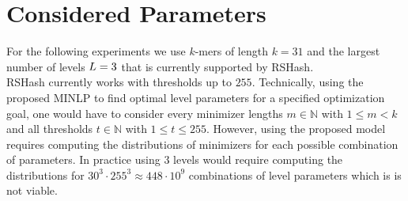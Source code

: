 \documentclass[a4paper,titlepage,onecolumn,oneside,12pt,nenglish,titlepage=firstiscover]{scrbook}
\theoremstyle{plain} %
\theoremstyle{definition} %
\theoremstyle{remark} %
\theoremstyle{plain}
\newcommand{\NN}{\mathbb{N}} %
\newcommand{\minimizerLength}{m}
\newcommand{\threshold}{t}
\begin{document}
\section{Considered Parameters} \label{sec:consideredParameters}
For the following experiments we use $k$-mers of length $k = 31$ and the largest number of levels ${L} = 3$ that is currently supported by RSHash.\\
RSHash currently works with thresholds up to $255$.
Technically, using the proposed MINLP to find optimal level parameters for a specified optimization goal, one would have to consider every minimizer lengths $\minimizerLength \in \NN$ with $1 \leq \minimizerLength < k$ and all thresholds $\threshold \in \NN$ with $1 \leq \threshold \leq 255$. However, using the proposed model requires computing the distributions of minimizers for each possible combination of parameters. In practice using $3$ levels would require computing the distributions for $30^3 \cdot 255^3 \approx 448 \cdot 10^9$ combinations of level parameters which is is not viable.\\
\end{document}
